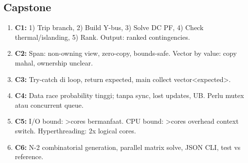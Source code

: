 \documentclass[12pt,a4paper]{article}
\begin{document}
\subsection*{Capstone}
\begin{enumerate}
  \item \textbf{C1:} 1) Trip branch, 2) Build Y-bus, 3) Solve DC PF, 4) Check thermal/islanding, 5) Rank. Output: ranked contingencies.
  \item \textbf{C2:} Span: non-owning view, zero-copy, bounds-safe. Vector by value: copy mahal, ownership unclear.
  \item \textbf{C3:} Try-catch di loop, return expected, main collect vector<expected>.
  \item \textbf{C4:} Data race probability tinggi; tanpa sync, lost updates, UB. Perlu mutex atau concurrent queue.
  \item \textbf{C5:} I/O bound: >cores bermanfaat. CPU bound: >cores overhead context switch. Hyperthreading: 2x logical cores.
  \item \textbf{C6:} N-2 combinatorial generation, parallel matrix solve, JSON CLI, test vs reference.
\end{enumerate}
\end{document}
